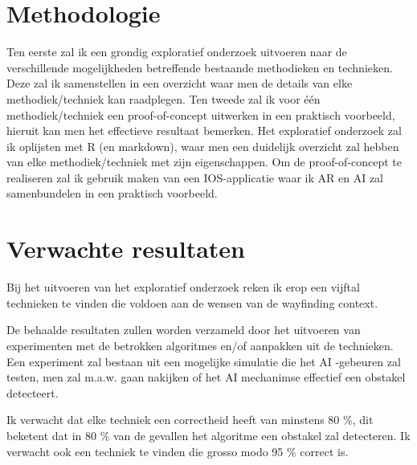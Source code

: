 
\section{Methodologie}
\label{sec:methodologie}
Ten eerste zal ik een grondig exploratief onderzoek uitvoeren naar de verschillende mogelijkheden betreffende bestaande methodieken en technieken. Deze zal ik samenstellen in een overzicht waar men de details van elke methodiek/techniek kan raadplegen. Ten tweede zal ik voor één methodiek/techniek een proof-of-concept uitwerken in een praktisch voorbeeld, hieruit kan men het effectieve resultaat bemerken.
Het exploratief onderzoek zal ik oplijsten met R (en markdown), waar men een duidelijk overzicht zal hebben van elke methodiek/techniek met zijn eigenschappen.
Om de proof-of-concept te realiseren zal ik gebruik maken van een IOS-applicatie waar ik AR en AI zal samenbundelen in een praktisch voorbeeld.

\section{Verwachte resultaten}
\label{sec:verwachte_resultaten}

Bij het uitvoeren van het exploratief onderzoek reken ik erop een vijftal technieken te vinden die voldoen aan de wensen van de wayfinding context.

De behaalde resultaten zullen worden verzameld door het uitvoeren van experimenten met de betrokken algoritmes en/of aanpakken uit de technieken. Een experiment zal bestaan uit een mogelijke simulatie die het AI -gebeuren zal testen, men zal m.a.w. gaan nakijken of het AI mechanimse effectief een obstakel detecteert.

Ik verwacht dat elke techniek een correctheid heeft van minstens 80 \%, dit beketent dat in 80 \% van de gevallen het algoritme een obstakel zal detecteren. Ik verwacht ook een techniek te vinden die grosso modo 95 \% correct is.

